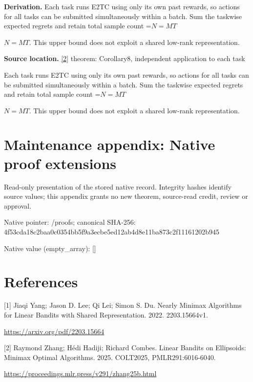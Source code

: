 \documentclass[10pt,a4paper]{article}
\newcommand{\AtlasMath}[1]{\par\begingroup\centering\setbox0=\hbox{$\displaystyle #1$}\ifdim\wd0>1.4\linewidth\typeout{ATLAS WIDE FORMULA: \the\wd0}\fi\ifdim\wd0>\linewidth\resizebox{\linewidth}{!}{\box0}\else\box0\fi\par\endgroup}
\newcommand{\AtlasInlineMath}[1]{\begingroup\setbox0=\hbox{$#1$}\ifdim\wd0>.4\linewidth\endgroup\AtlasMath{#1}\else\endgroup$#1$\fi}
\begin{document}
\textbf{Derivation.} Each task runs E2TC using only its own past rewards, so actions for all tasks can be submitted simultaneously within a batch. Sum the taskwise expected regrets and retain total sample count \AtlasInlineMath{N=MT}. This upper bound does not exploit a shared low-rank representation.



\textbf{Source location.} \href{https://proceedings.mlr.press/v291/zhang25b.html}{[2]} theorem: Corollary8, independent application to each task



Each task runs E2TC using only its own past rewards, so actions for all tasks can be submitted simultaneously within a batch. Sum the taskwise expected regrets and retain total sample count \AtlasInlineMath{N=MT}. This upper bound does not exploit a shared low-rank representation.



\section{Maintenance appendix: Native proof extensions}


Read-only presentation of the stored native record. Integrity hashes identify source values; this appendix grants no new theorem, source-read credit, review or approval.



Native pointer: /proofs; canonical SHA-256: 4f53cda18c2baa0c0354bb5f\allowbreak{}9a3ecbe5ed12ab4d8e11ba87\allowbreak{}3c2f11161202b945



Native value (empty\_array): []



\section{References}


[1] Jiaqi Yang; Jason D. Lee; Qi Lei; Simon S. Du. Nearly Minimax Algorithms for Linear Bandits with Shared Representation. 2022. 2203.15664v1.



\url{https://arxiv.org/pdf/2203.15664}



[2] Raymond Zhang; Hédi Hadiji; Richard Combes. Linear Bandits on Ellipsoids: Minimax Optimal Algorithms. 2025. COLT2025, PMLR291:6016-6040.



\url{https://proceedings.mlr.press/v291/zhang25b.html}
\end{document}
